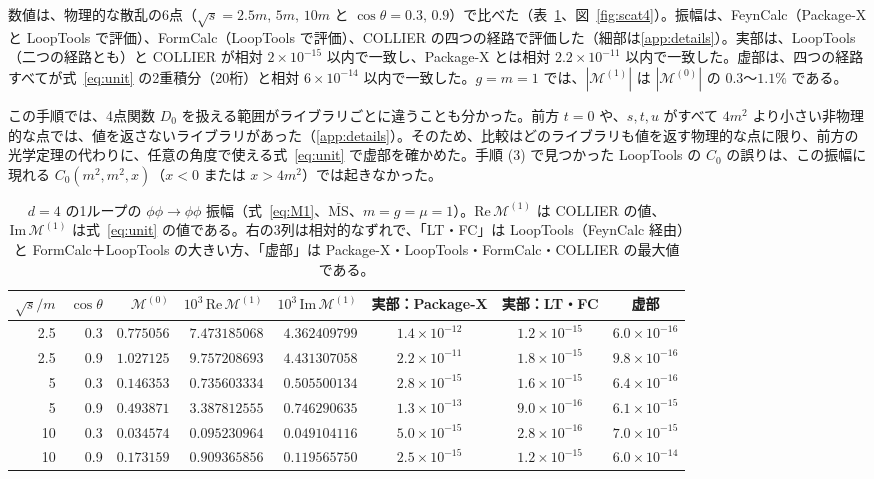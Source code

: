 \documentclass[a4paper,10pt]{ltjsarticle}
\begin{document}
数値は、物理的な散乱の6点（$\sqrt s=2.5m,\,5m,\,10m$ と $\cos\theta=0.3,\,0.9$）で比べた（表~\ref{tab:scat4}、図~\ref{fig:scat4}）。振幅は、FeynCalc（Package-X と LoopTools で評価）、FormCalc（LoopTools で評価）、COLLIER の四つの経路で評価した（細部は\ref{app:details}）。実部は、LoopTools（二つの経路とも）と COLLIER が相対 $2\times10^{-15}$ 以内で一致し、Package-X とは相対 $2.2\times10^{-11}$ 以内で一致した。虚部は、四つの経路すべてが式~\eqref{eq:unit} の2重積分（20桁）と相対 $6\times10^{-14}$ 以内で一致した。$g=m=1$ では、$|\mathcal{M}^{(1)}|$ は $|\mathcal{M}^{(0)}|$ の $0.3$〜$1.1\%$ である。

この手順では、4点関数 $D_0$ を扱える範囲がライブラリごとに違うことも分かった。前方 $t=0$ や、$s,t,u$ がすべて $4m^2$ より小さい非物理的な点では、値を返さないライブラリがあった（\ref{app:details}）。そのため、比較はどのライブラリも値を返す物理的な点に限り、前方の光学定理の代わりに、任意の角度で使える式~\eqref{eq:unit} で虚部を確かめた。手順 (3) で見つかった LoopTools の $C_0$ の誤りは、この振幅に現れる $C_0(m^2,m^2,x)$（$x<0$ または $x>4m^2$）では起きなかった。

\begin{table}[tbp]
\centering\small
\caption{$d=4$ の1ループの $\phi\phi\to\phi\phi$ 振幅（式~\eqref{eq:M1}、$\overline{\mathrm{MS}}$、$m=g=\mu=1$）。$\mathrm{Re}\,\mathcal{M}^{(1)}$ は COLLIER の値、$\mathrm{Im}\,\mathcal{M}^{(1)}$ は式~\eqref{eq:unit} の値である。右の3列は相対的なずれで、「LT・FC」は LoopTools（FeynCalc 経由）と FormCalc＋LoopTools の大きい方、「虚部」は Package-X・LoopTools・FormCalc・COLLIER の最大値である。}
\label{tab:scat4}
\begin{tabular}{rrrrrccc}
\toprule
$\sqrt s/m$ & $\cos\theta$ & $\mathcal{M}^{(0)}$ & $10^3\,\mathrm{Re}\,\mathcal{M}^{(1)}$ & $10^3\,\mathrm{Im}\,\mathcal{M}^{(1)}$ & 実部：Package-X & 実部：LT・FC & 虚部 \\
\midrule
2.5 & 0.3 & $0.775056$ & $7.473185068$ & $4.362409799$ & $1.4\times10^{-12}$ & $1.2\times10^{-15}$ & $6.0\times10^{-16}$ \\
2.5 & 0.9 & $1.027125$ & $9.757208693$ & $4.431307058$ & $2.2\times10^{-11}$ & $1.8\times10^{-15}$ & $9.8\times10^{-16}$ \\
5 & 0.3 & $0.146353$ & $0.735603334$ & $0.505500134$ & $2.8\times10^{-15}$ & $1.6\times10^{-15}$ & $6.4\times10^{-16}$ \\
5 & 0.9 & $0.493871$ & $3.387812555$ & $0.746290635$ & $1.3\times10^{-13}$ & $9.0\times10^{-16}$ & $6.1\times10^{-15}$ \\
10 & 0.3 & $0.034574$ & $0.095230964$ & $0.049104116$ & $5.0\times10^{-15}$ & $2.8\times10^{-16}$ & $7.0\times10^{-15}$ \\
10 & 0.9 & $0.173159$ & $0.909365856$ & $0.119565750$ & $2.5\times10^{-15}$ & $1.2\times10^{-15}$ & $6.0\times10^{-14}$ \\
\bottomrule
\end{tabular}
\end{table}
\end{document}
